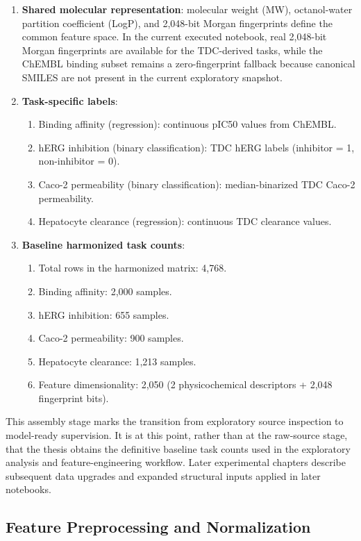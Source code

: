 \documentclass[a4paper,11pt,twoside]{report}
\begin{document}
\begin{enumerate}
\item \textbf{Shared molecular representation}: molecular weight (MW), octanol-water partition coefficient (LogP), and 2,048-bit Morgan fingerprints define the common feature space. In the current executed notebook, real 2,048-bit Morgan fingerprints are available for the TDC-derived tasks, while the ChEMBL binding subset remains a zero-fingerprint fallback because canonical SMILES are not present in the current exploratory snapshot.
\item \textbf{Task-specific labels}: 
  \begin{enumerate}
  \item Binding affinity (regression): continuous pIC50 values from ChEMBL.
  \item hERG inhibition (binary classification): TDC hERG labels (inhibitor = 1, non-inhibitor = 0).
  \item Caco-2 permeability (binary classification): median-binarized TDC Caco-2 permeability.
  \item Hepatocyte clearance (regression): continuous TDC clearance values.
  \end{enumerate}
\item \textbf{Baseline harmonized task counts}: 
  \begin{enumerate}
  \item Total rows in the harmonized matrix: 4,768.
  \item Binding affinity: 2,000 samples.
  \item hERG inhibition: 655 samples.
  \item Caco-2 permeability: 900 samples.
  \item Hepatocyte clearance: 1,213 samples.
  \item Feature dimensionality: 2,050 (2 physicochemical descriptors + 2,048 fingerprint bits).
  \end{enumerate}
\end{enumerate}

This assembly stage marks the transition from exploratory source inspection to model-ready supervision. It is at this point, rather than at the raw-source stage, that the thesis obtains the definitive baseline task counts used in the exploratory analysis and feature-engineering workflow. Later experimental chapters describe subsequent data upgrades and expanded structural inputs applied in later notebooks.

\subsection{Feature Preprocessing and Normalization}
\end{document}
